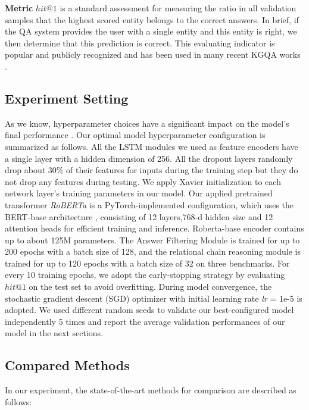 \documentclass[pdflatex,sn-mathphys]{sn-jnl}%
\theoremstyle{thmstyleone}%
\theoremstyle{thmstyletwo}%
\theoremstyle{thmstylethree}%
\begin{document}
\textbf{Metric} $hit@1$ is a standard assessment for measuring the ratio in all validation samples that the highest scored entity belongs to the correct answers. In brief, if the QA system provides the user with a single entity and this entity is right, we then determine that this prediction is correct. This evaluating indicator is popular and publicly recognized and has been used in many recent KGQA works \cite{apoorv2020embedKGQA,chen2019uhopKGQA,yunshi2020graphKGQA}.


\subsection{Experiment Setting}
As we know, hyperparameter choices have a significant impact on the model's final performance \cite{electronics3zuojwq,cvtassd1zuojwq}. Our optimal model hyperparameter configuration is summarized as follows. All the LSTM modules we used as feature encoders have a single layer with a hidden dimension of 256. All the dropout layers randomly drop about 30\% of their features for inputs during the training step but they do not drop any features during testing. We apply Xavier initialization to each network layer's training parameters in our model.
\textcolor[rgb]{1,0,0}{Our applied pretrained transformer \textit{RoBERTa} is a PyTorch-implemented configuration, which uses the BERT-base architecture \cite{tqx1zuoenhancere,google2018bert}, consisting of 12 layers,768-d hidden size and 12 attention heads for efficient training and inference. Roberta-base encoder \cite{ott2019fairseq,roberta} contains up to about 125M parameters. The Answer Filtering Module is trained for up to 200 epochs with a batch size of 128, and the relational chain reasoning module is trained for up to 120 epochs with a batch size of 32 on three benchmarks.} For every 10 training epochs, we adopt the early-stopping strategy by evaluating $hit@1$ on the test set to avoid overfitting. During model convergence, the stochastic gradient descent (SGD) optimizer with initial learning rate \textit{lr} = 1e-5 is adopted. We used different random seeds to validate our best-configured model independently 5 times and report the average validation performances of our model in the next sections.

\subsection{Compared Methods}
In our experiment, the state-of-the-art methods for comparison are described as follows:
\end{document}
